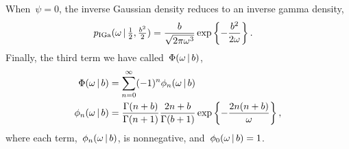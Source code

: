 When~$\psi=0$, the inverse Gaussian
density reduces to an inverse gamma density,
\begin{align*}
  p_{\mathrm{IGa}}(\omega \,|\, \tfrac{1}{2}, \tfrac{b^2}{2}) &=
  \frac{b}{\sqrt{2 \pi \omega^3}} \exp \left \{- \frac{b^2}{2\omega} \right \}.
\end{align*}
Finally, the third term we have called~$\Phi({\omega} \,|\, b)$, 
\begin{align*}
  \Phi({\omega} \,|\, b)  
  &= \sum_{n=0}^\infty (-1)^n \phi_n(\omega \,|\, b) \\ 
  \phi_n(\omega \,|\, b)
  &=
  \frac{\Gamma(n+b)}{\Gamma(n+1)} \frac{2n+b}{\Gamma(b+1)}
    \exp\left\{- \frac{2n(n+b)}{{\omega}} \right\},
\end{align*}
where each term,~$\phi_n(\omega \,|\, b)$, is nonnegative,
and~$\phi_0(\omega \,|\, b)=1$. 

